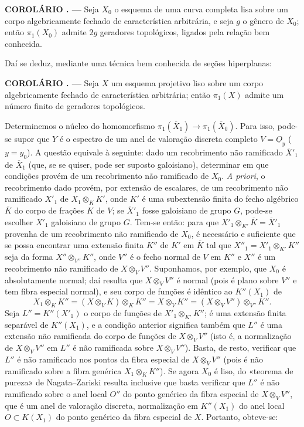 \documentclass[11pt,twoside,openany]{book}
\numberwithin{equation}{section}
\newcommand{\Osh}{\underline{O}}
\theoremstyle{plain}
\theoremstyle{definition}
\theoremstyle{remark}
\newcommand{\result}[2]{%
  \par\medskip\noindent\textbf{#1%
  \if\relax\detokenize{#2}\relax\else\space#2\fi. ---}\enspace
}
\begin{document}
\result{COROLÁRIO}{3} Seja $X_0$ o esquema de uma curva completa lisa sobre
um corpo algebricamente fechado de característica arbitrária, e seja $g$ o
gênero de $X_0$; então $\pi_1(X_0)$ admite $2g$ geradores topológicos,
ligados pela relação bem conhecida.

Daí se deduz, mediante uma técnica bem conhecida de seções
hiperplanas:

\result{COROLÁRIO}{4} Seja $X$ um esquema projetivo liso sobre um corpo
algebricamente fechado de característica arbitrária; então $\pi_1(X)$
admite um número finito de geradores topológicos.

Determinemos o núcleo do homomorfismo
$\pi_1(\overline X_1)\longrightarrow\pi_1(\overline X_0)$. Para isso, pode-se
supor que $Y$ é o espectro de um anel de valoração discreta completo
$V=\Osh_y$ ($y=y_0$). A questão equivale à seguinte: dado um recobrimento
não ramificado $\overline X'_1$ de $\overline X_1$ (que, se se quiser, pode
ser suposto galoisiano), determinar em que condições provém de um
recobrimento não ramificado de $X_0$. \textit{A priori}, o recobrimento dado
provém, por extensão de escalares, de um recobrimento não ramificado $X'_1$
de $X_1\otimes_K K'$, onde $K'$ é uma subextensão finita do fecho
algébrico $\overline K$ do corpo de frações $K$ de $V$; se
$\overline X'_1$ fosse galoisiano de grupo $G$, pode-se escolher $X'_1$
galoisiano de grupo $G$. Tem-se então: para que
$X'_1\otimes_{K'}\overline K=\overline X'_1$ provenha de um recobrimento não
ramificado de $X_0$, é necessário e suficiente que se possa encontrar uma extensão
finita $K''$ de $K'$ em $\overline K$ tal que
$X''_1=X'_1\otimes_{K'}K''$ seja da forma $X''\otimes_{V''}K''$, onde $V''$
é o fecho normal de $V$ em $K''$ e $X''$ é um recobrimento não ramificado
de $X\otimes_VV''$. Suponhamos, por exemplo, que $X_0$ é absolutamente normal;
daí resulta que $X\otimes_VV''$ é normal (pois é plano sobre $V''$ e tem
fibra especial normal), e seu corpo de funções é idêntico ao $K''(X_1)$ de
\[
  X_1\otimes_KK''
  =(X\otimes_VK)\otimes_KK''
  =X\otimes_VK''
  =(X\otimes_VV'')\otimes_{V''}K''.
\]
Seja $L''=K''(X'_1)$ o corpo de funções de $X'_1\otimes_{K'}K''$; é uma
extensão finita separável de $K''(X_1)$, e a condição anterior significa
também que $L''$ é uma extensão não ramificada do corpo de funções de
$X\otimes_VV''$ (isto é, a normalização de $X\otimes_VV''$ em $L''$ é não
ramificada sobre $X\otimes_VV''$). Basta, de resto, verificar que $L''$ é
não ramificado nos pontos da fibra especial de $X\otimes_VV''$ (pois é não
ramificado sobre a fibra genérica $X_1\otimes_KK''$). Se agora $X_0$ é liso,
do «teorema de pureza» de Nagata--Zariski resulta inclusive que basta verificar
que $L''$ é não ramificado sobre o anel local $O''$ do ponto genérico da
fibra especial de $X\otimes_VV''$, que é um anel de valoração discreta,
normalização em $K''(X_1)$ do anel local $O\subset K(X_1)$ do ponto
genérico da fibra especial de $X$. Portanto, obteve-se:
\end{document}
